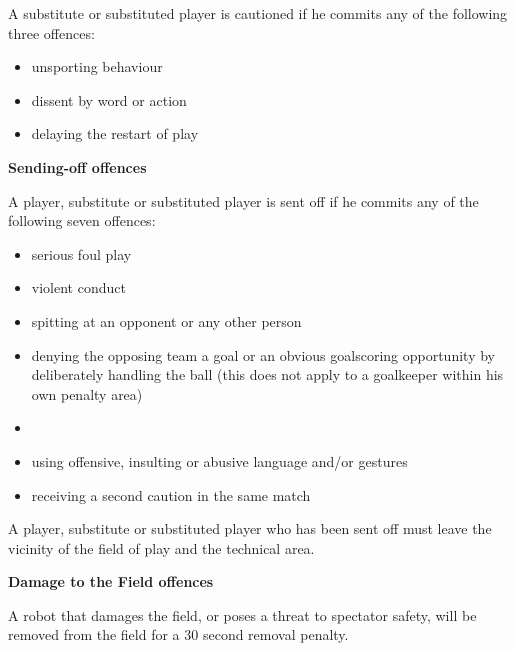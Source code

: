 \bigskip

A substitute or substituted player is cautioned if he commits any of the following three offences: 

\begin{itemize}
\item unsporting behaviour
\item dissent by word or action 
\item delaying the restart of play
\end{itemize}

{\bfseries Sending-off offences}

\headlinebox

A player, substitute or substituted player is sent off if he commits any of the following seven offences:

\begin{itemize}
\item serious foul play
\item violent conduct
\item spitting at an opponent or any other person
\item denying the opposing team a goal or an obvious goalscoring opportunity by deliberately handling the ball (this does not apply to a goalkeeper within his own penalty area)
\item {}
\item using offensive, insulting or abusive language and/or gestures
\item receiving a second caution in the same match
\end{itemize}

\bigskip

A player, substitute or substituted player who has been sent off must leave the vicinity of the field of play and the technical area.
 
\bigskip

{\bfseries Damage to the Field offences}

\headlinebox

A robot that damages the field, or poses a threat to spectator safety, will be removed from the field for a 30 second removal penalty.

